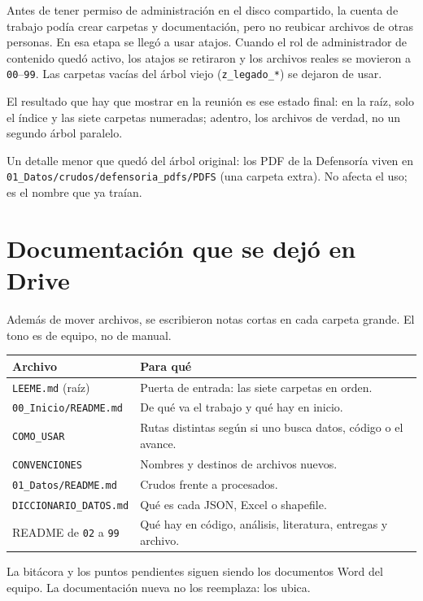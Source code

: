 \documentclass[11pt,a4paper]{article}
\begin{document}
Antes de tener permiso de administración en el disco compartido, la cuenta de trabajo podía crear carpetas y documentación, pero no reubicar archivos de otras personas. En esa etapa se llegó a usar atajos. Cuando el rol de administrador de contenido quedó activo, los atajos se retiraron y los archivos reales se movieron a \texttt{00}--\texttt{99}. Las carpetas vacías del árbol viejo (\texttt{z\_legado\_*}) se dejaron de usar.

El resultado que hay que mostrar en la reunión es ese estado final: en la raíz, solo el índice y las siete carpetas numeradas; adentro, los archivos de verdad, no un segundo árbol paralelo.

Un detalle menor que quedó del árbol original: los PDF de la Defensoría viven en \texttt{01\_Datos/crudos/defensoria\_pdfs/PDFS} (una carpeta extra). No afecta el uso; es el nombre que ya traían.

\section{Documentación que se dejó en Drive}

Además de mover archivos, se escribieron notas cortas en cada carpeta grande. El tono es de equipo, no de manual.

\begin{center}
\renewcommand{\arraystretch}{1.2}
\begin{tabularx}{\textwidth}{@{}l Y@{}}
\toprule
\textbf{Archivo} & \textbf{Para qué} \\
\midrule
\texttt{LEEME.md} (raíz) & Puerta de entrada: las siete carpetas en orden. \\
\texttt{00\_Inicio/README.md} & De qué va el trabajo y qué hay en inicio. \\
\texttt{COMO\_USAR} & Rutas distintas según si uno busca datos, código o el avance. \\
\texttt{CONVENCIONES} & Nombres y destinos de archivos nuevos. \\
\texttt{01\_Datos/README.md} & Crudos frente a procesados. \\
\texttt{DICCIONARIO\_DATOS.md} & Qué es cada JSON, Excel o shapefile. \\
README de \texttt{02} a \texttt{99} & Qué hay en código, análisis, literatura, entregas y archivo. \\
\bottomrule
\end{tabularx}
\end{center}

La bitácora y los puntos pendientes siguen siendo los documentos Word del equipo. La documentación nueva no los reemplaza: los ubica.
\end{document}
